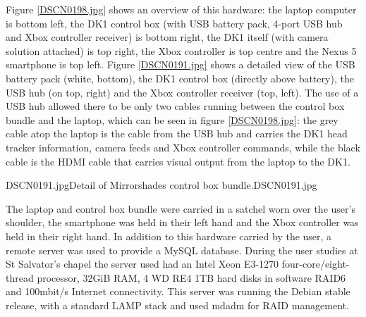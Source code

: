 Figure \ref{DSCN0198.jpg} shows an overview of this hardware: the laptop computer is bottom left, the DK1 control box (with USB battery pack, 4-port USB hub and Xbox controller receiver) is bottom right, the DK1 itself (with camera solution attached) is top right, the Xbox controller is top centre and the Nexus 5 smartphone is top left. Figure \ref{DSCN0191.jpg} shows a detailed view of the USB battery pack (white, bottom), the DK1 control box (directly above battery), the USB hub (on top, right) and the Xbox controller receiver (top, left). The use of a USB hub allowed there to be only two cables running between the control box bundle and the laptop, which can be seen in figure \ref{DSCN0198.jpg}: the grey cable atop the laptop is the cable from the USB hub and carries the DK1 head tracker information, camera feeds and Xbox controller commands, while the black cable is the HDMI cable that carries visual output from the laptop to the DK1.

       {DSCN0191.jpg}{Detail of Mirrorshades control box bundle.}{DSCN0191.jpg}

The laptop and control box bundle were carried in a satchel worn over the user's shoulder, the smartphone was held in their left hand and the Xbox controller was held in their right hand. In addition to this hardware carried by the user, a remote server was used to provide a MySQL database. During the user studies at St Salvator's chapel the server used had an Intel Xeon E3-1270 four-core/eight-thread processor, 32GiB RAM, 4 WD RE4 1TB hard disks in software RAID6 and 100mbit/s Internet connectivity. This server was running the Debian stable release, with a standard LAMP stack and used mdadm for RAID management.

